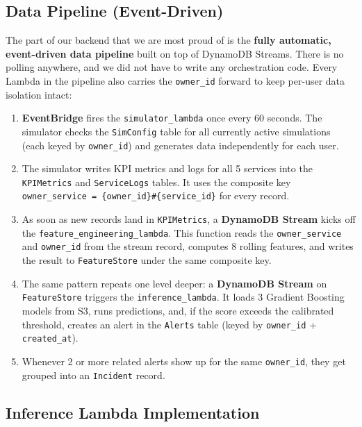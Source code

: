 \documentclass[11pt,a4paper]{article}
\begin{document}
\subsection{Data Pipeline (Event-Driven)}

The part of our backend that we are most proud of is the \textbf{fully automatic, event-driven data pipeline} built on top of DynamoDB Streams. There is no polling anywhere, and we did not have to write any orchestration code. Every Lambda in the pipeline also carries the \texttt{owner\_id} forward to keep per-user data isolation intact:

\begin{enumerate}[leftmargin=2em]
    \item \textbf{EventBridge} fires the \texttt{simulator\_lambda} once every 60 seconds. The simulator checks the \texttt{SimConfig} table for all currently active simulations (each keyed by \texttt{owner\_id}) and generates data independently for each user.
    \item The simulator writes KPI metrics and logs for all 5 services into the \texttt{KPIMetrics} and \texttt{ServiceLogs} tables. It uses the composite key \texttt{owner\_service = \{owner\_id\}\#\{service\_id\}} for every record.
    \item As soon as new records land in \texttt{KPIMetrics}, a \textbf{DynamoDB Stream} kicks off the \newline \texttt{feature\_engineering\_lambda}. This function reads the \texttt{owner\_service} and \texttt{owner\_id} from the stream record, computes 8 rolling features, and writes the result to \texttt{FeatureStore} under the same composite key.
    \item The same pattern repeats one level deeper: a \textbf{DynamoDB Stream} on \texttt{FeatureStore} triggers the \texttt{inference\_lambda}. It loads 3 Gradient Boosting models from S3, runs predictions, and, if the score exceeds the calibrated threshold, creates an alert in the \texttt{Alerts} table (keyed by \texttt{owner\_id} + \texttt{created\_at}).
    \item Whenever 2 or more related alerts show up for the same \texttt{owner\_id}, they get grouped into an \texttt{Incident} record.
\end{enumerate}

\subsection{Inference Lambda Implementation}
\end{document}
